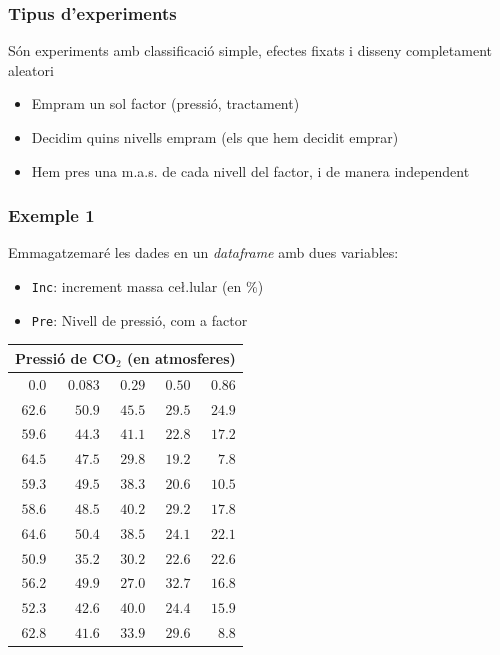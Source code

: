 \documentclass[12pt,t]{beamer}
\theoremstyle{plain}
\theoremstyle{definition}
\begin{document}
\begin{frame}
\frametitle{Tipus d'experiments}

Són experiments amb classificació simple, efectes fixats i disseny completament aleatori
\begin{itemize}
\item Empram un sol factor (pressió, tractament)
\medskip

\item Decidim quins nivells empram (els que hem decidit emprar)
\medskip

\item Hem pres una m.a.s. de cada nivell del factor, i de manera independent
\end{itemize}
\end{frame}

\begin{frame}
\frametitle{Exemple 1}
Emmagatzemaré les dades  en  un \textsl{dataframe} amb dues variables:
\begin{itemize}
\item \texttt{Inc}: increment massa ce\l.lular (en \%)
\item \texttt{Pre}: Nivell de pressió, com a factor
\end{itemize}

{\footnotesize \begin{center}
\begin{tabular}{rrrrr}
\multicolumn{5}{c}{Pressió de CO${}_2$ (en atmosferes)}\\\hline
$0.0$&$0.083$&$0.29$&$0.50$&$0.86$\\\hline
$62.6$&$50.9$&$45.5$&$29.5$&$24.9$\\
$59.6$&$44.3$&$41.1$&$22.8$&$17.2$\\
$64.5$&$47.5$&$29.8$&$19.2$&$7.8$\\
$59.3$&$49.5$&$38.3$&$20.6$&$10.5$\\
$58.6$&$48.5$&$40.2$&$29.2$&$17.8$\\
$64.6$&$50.4$&$38.5$&$24.1$&$22.1$\\
$50.9$&$35.2$&$30.2$&$22.6$&$22.6$\\
$56.2$&$49.9$&$27.0$&$32.7$&$16.8$\\
$52.3$&$42.6$&$40.0$&$24.4$&$15.9$\\
$62.8$&$41.6$&$33.9$&$29.6$&$8.8$\\
\end{tabular}
\end{center}
}\end{frame}
\end{document}
